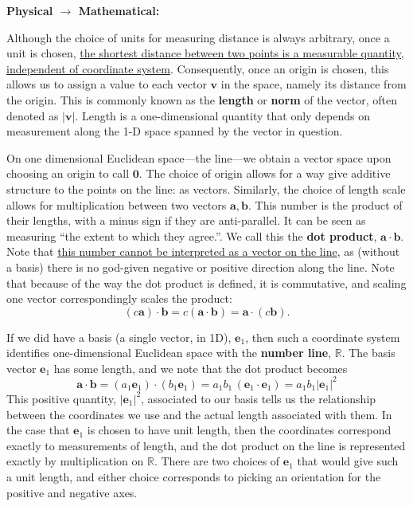 \documentclass[../master.tex]{subfiles}
\begin{document}
	\begin{center}
		\textbf{Physical $\to$ Mathematical:}
	\end{center}
	
	Although the choice of units for measuring distance is always arbitrary, once a unit is chosen, \ul{the shortest distance between two points is a measurable quantity, independent of coordinate system}. Consequently, once an origin is chosen, this allows us to assign a value to each vector $\mathbf v$ in the space, namely its distance from the origin. This is commonly known as the  \textbf{length} or \textbf{norm} of the vector, often denoted as $|\mathbf v|$. Length is a one-dimensional quantity that only depends on measurement along the 1-D space spanned by the vector in question.
	
	On one dimensional Euclidean space---the line---we obtain a vector space upon choosing an origin to call $\mathbf 0$. The choice of origin allows for a way give additive structure to the points on the line: as vectors. Similarly, the choice of length scale allows for multiplication between two vectors $\mathbf a, \mathbf b$. This number is the product of their lengths, with a minus sign if they are anti-parallel. It can be seen as measuring ``the extent to which they agree.''. We call this the \textbf{dot product}, $\mathbf a \cdot \mathbf b$. Note that \ul{this number cannot be interpreted as a vector on the line}, as (without a basis) there is no god-given negative or positive direction along the line. Note that because of the way the dot product is defined, it is commutative, and scaling one vector correspondingly scales the product: 
	\begin{equation}
		(c \mathbf a) \cdot \mathbf b = c (\mathbf a \cdot \mathbf b) = \mathbf a \cdot (c \mathbf b).
	\end{equation}
	
	If we did have a basis (a single vector, in 1D), $\mathbf e_1$, then such a coordinate system identifies one-dimensional Euclidean space with the \textbf{number line}, $\mathbb R$. The basis vector $\mathbf e_1$ has some length, and we note that the dot product becomes 
	\begin{equation}
		\mathbf a \cdot \mathbf b = (a_1 \mathbf e_1) \cdot (b_1 \mathbf e_1) = a_1 b_1  \, (\mathbf e_1 \cdot \mathbf e_1) = a_1 b_1 |\mathbf e_1|^2
	\end{equation}
	This positive quantity, $|\mathbf e_1|^2$, associated to our basis tells us the relationship between the coordinates we use and the actual length associated with them. In the case that $\mathbf e_1$ is chosen to have unit length, then the coordinates correspond exactly to measurements of length, and the dot product on the line is represented exactly by multiplication on $\mathbb R$. There are two choices of $\mathbf e_1$ that would give such a unit length, and either choice corresponds to picking an orientation for the positive and negative axes.
	
\end{document}

